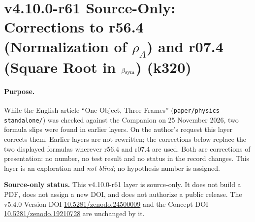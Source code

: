 
\clearpage
\section*{v4.10.0-r61 Source-Only: Corrections to r56.4 (Normalization of \texorpdfstring{\(\rho_\Lambda\)}{rho Lambda}) and r07.4 (Square Root in \texorpdfstring{\(\beta_{\rm sym}\)}{beta sym}) (k320)}
\label{sec:v4100-r61-corrections}

\paragraph{Purpose.}
While the English article ``One Object, Three Frames'' (\texttt{paper/\allowbreak physics-standalone/}) was checked against the Companion on
25 November 2026, two formula slips were found in earlier layers.  On the author's request this layer corrects them.  Earlier layers are not
rewritten; the corrections below replace the two displayed formulas wherever r56.4 and r07.4 are used.  Both are corrections of
presentation: no number, no test result and no status in the record changes.  This layer is an exploration and \emph{not blind}; no hypothesis
number is assigned.

\noindent\textbf{Source-only status.}
This v4.10.0-r61 layer is source-only.  It does not build a PDF, does not assign a new DOI,
and does not authorize a public release.  The v5.4.0 Version DOI
\href{https://doi.org/10.5281/zenodo.24500009}{10.5281/zenodo.24500009} and the Concept DOI
\href{https://doi.org/10.5281/zenodo.19210728}{10.5281/zenodo.19210728} are unchanged by it.

